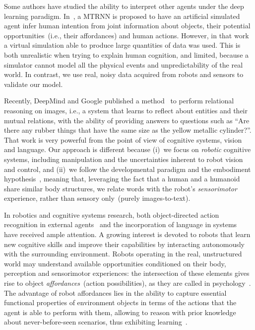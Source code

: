 Some authors have studied the ability to interpret other agents under the deep learning paradigm.
In~\cite{kim:2017:nn}, a \ac{MTRNN} is proposed to have an artificial simulated agent infer human intention from joint information about objects, their potential opportunities~(i.e., their affordances) and human actions.
However, in that work a virtual simulation able to produce large quantities of data was used.
This is both unrealistic when trying to explain human cognition, and limited, because a simulator cannot model all the physical events and unpredictability of the real world.
In contrast, we use real, noisy data acquired from robots and sensors to validate our model.

Recently, DeepMind and Google published a method~\cite{santoro:2017:relational_reasoning} to perform relational reasoning on images, i.e., a system that learns to reflect about entities and their mutual relations, with the ability of providing answers to questions such as ``Are there any rubber things that have the same size as the yellow metallic cylinder?''.
That work is very powerful from the point of view of cognitive systems, vision and language.
Our approach is different because (i)~we focus on \emph{robotic} cognitive systems, including manipulation and the uncertainties inherent to robot vision and control, and (ii)~we follow the developmental paradigm and the embodiment hypothesis~\cite{lungarella:2003:devrobsurvey}, meaning that, leveraging the fact that a human and a humanoid share similar body structures, we relate words with the robot's \emph{sensorimotor} experience, rather than sensory only~(purely images-to-text).

In robotics and cognitive systems research, both object-directed action recognition in external agents~\cite{koppula:2013:ijrr} and the incorporation of language in \hr{} systems~\cite{harnad:1990,matuszek:2014:aaai} have received ample attention.
A growing interest is devoted to robots that learn new cognitive skills and improve their capabilities by interacting autonomously with the surrounding environment.
Robots operating in the real, unstructured world may understand available opportunities conditioned on their body, perception and sensorimotor experiences: the intersection of these elements gives rise to object \emph{affordances}~(action possibilities), as they are called in psychology~\cite{gibson:2014}.
The advantage of robot affordances lies in the ability to capture essential functional properties of environment objects in terms of the actions that the agent is able to perform with them, allowing to reason with prior knowledge about never-before-seen scenarios, thus exhibiting learning~\cite{montesano:2008,jamone:2016:tcds}.

